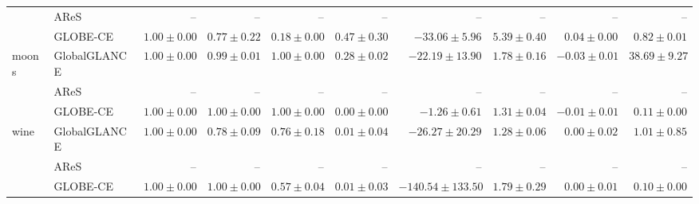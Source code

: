 \begin{table}[ht]
\begin{center}
\begin{sc}
\begin{scriptsize}
\begin{tabular}{l|l|rrrrrrrr}
 & AReS & -- & -- & -- & -- & -- & -- & -- & -- \\
 & GLOBE-CE & $\boldsymbol{1.00\pm{0.00}}$ & $0.77\pm{0.22}$ & $0.18\pm{0.00}$ & $\boldsymbol{0.47\pm{0.30}}$ & $\boldsymbol{-33.06\pm{5.96}}$ & $5.39\pm{0.40}$ & $\boldsymbol{0.04\pm{0.00}}$ & $\boldsymbol{0.82\pm{0.01}}$ \\
\midrule
\multirow{3}{*}{moons} & GlobalGLANCE & $\boldsymbol{1.00\pm{0.00}}$ & $0.99\pm{0.01}$ & $\boldsymbol{1.00\pm{0.00}}$ & $\boldsymbol{0.28\pm{0.02}}$ & $-22.19\pm{13.90}$ & $1.78\pm{0.16}$ & $-0.03\pm{0.01}$ & $38.69\pm{9.27}$ \\
 & AReS & -- & -- & -- & -- & -- & -- & -- & -- \\
 & GLOBE-CE & $\boldsymbol{1.00\pm{0.00}}$ & $\boldsymbol{1.00\pm{0.00}}$ & $\boldsymbol{1.00\pm{0.00}}$ & $0.00\pm{0.00}$ & $\boldsymbol{-1.26\pm{0.61}}$ & $\boldsymbol{1.31\pm{0.04}}$ & $\boldsymbol{-0.01\pm{0.01}}$ & $\boldsymbol{0.11\pm{0.00}}$ \\
\midrule
\multirow{3}{*}{wine} & GlobalGLANCE & $\boldsymbol{1.00\pm{0.00}}$ & $0.78\pm{0.09}$ & $\boldsymbol{0.76\pm{0.18}}$ & $\boldsymbol{0.01\pm{0.04}}$ & $\boldsymbol{-26.27\pm{20.29}}$ & $\boldsymbol{1.28\pm{0.06}}$ & $\boldsymbol{0.00\pm{0.02}}$ & $1.01\pm{0.85}$ \\
 & AReS & -- & -- & -- & -- & -- & -- & -- & -- \\
 & GLOBE-CE & $\boldsymbol{1.00\pm{0.00}}$ & $\boldsymbol{1.00\pm{0.00}}$ & $0.57\pm{0.04}$ & $\boldsymbol{0.01\pm{0.03}}$ & $-140.54\pm{133.50}$ & $1.79\pm{0.29}$ & $\boldsymbol{0.00\pm{0.01}}$ & $\boldsymbol{0.10\pm{0.00}}$ \\
\bottomrule
\end{tabular}
\end{scriptsize}
\end{sc}
\end{center}
\end{table}

